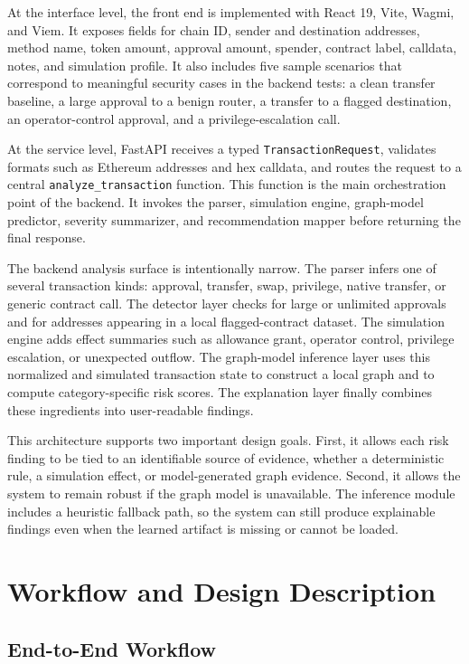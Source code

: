 \documentclass[11pt]{article}
\begin{document}
At the interface level, the front end is implemented with React 19, Vite, Wagmi, and Viem. It exposes fields for chain ID, sender and destination addresses, method name, token amount, approval amount, spender, contract label, calldata, notes, and simulation profile. It also includes five sample scenarios that correspond to meaningful security cases in the backend tests: a clean transfer baseline, a large approval to a benign router, a transfer to a flagged destination, an operator-control approval, and a privilege-escalation call.

At the service level, FastAPI receives a typed \texttt{TransactionRequest}, validates formats such as Ethereum addresses and hex calldata, and routes the request to a central \texttt{analyze\_transaction} function. This function is the main orchestration point of the backend. It invokes the parser, simulation engine, graph-model predictor, severity summarizer, and recommendation mapper before returning the final response.

The backend analysis surface is intentionally narrow. The parser infers one of several transaction kinds: approval, transfer, swap, privilege, native transfer, or generic contract call. The detector layer checks for large or unlimited approvals and for addresses appearing in a local flagged-contract dataset. The simulation engine adds effect summaries such as allowance grant, operator control, privilege escalation, or unexpected outflow. The graph-model inference layer uses this normalized and simulated transaction state to construct a local graph and to compute category-specific risk scores. The explanation layer finally combines these ingredients into user-readable findings.

This architecture supports two important design goals. First, it allows each risk finding to be tied to an identifiable source of evidence, whether a deterministic rule, a simulation effect, or model-generated graph evidence. Second, it allows the system to remain robust if the graph model is unavailable. The inference module includes a heuristic fallback path, so the system can still produce explainable findings even when the learned artifact is missing or cannot be loaded.

\section{Workflow and Design Description}

\subsection{End-to-End Workflow}
\end{document}

